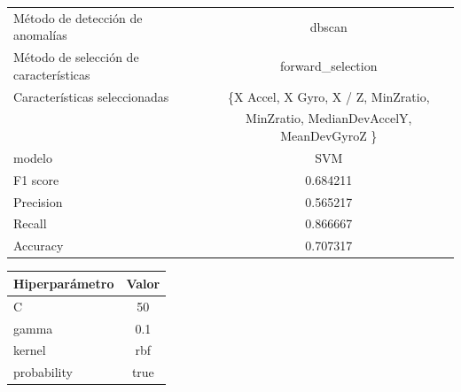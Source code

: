 \begin{appendices}
\begin{table}[htb]
			\begin{tabular}{lc}
				\toprule
					  Método de detección de anomalías &                                             dbscan \\
				Método de selección de características &                                  forward\_selection \\
						 Características seleccionadas & \{X Accel, X Gyro, X / Z, MinZratio,   \\
						 							   &  MinZratio, MedianDevAccelY, MeanDevGyroZ \} \\
												modelo &                                                SVM \\
											  F1 score &                                           0.684211 \\
											 Precision &                                           0.565217 \\
												Recall &                                           0.866667 \\
											  Accuracy &                                           0.707317 \\
				\bottomrule
			\end{tabular}
			\newline
			\newline

			\begin{tabular}{lc}
				\toprule
				Hiperparámetro & Valor \\
				\midrule
							 C &    50 \\
						 gamma &   0.1 \\
						kernel &   rbf \\
				   probability &  true \\
				\bottomrule
			\end{tabular}
			
		\end{table}


\end{appendices}
